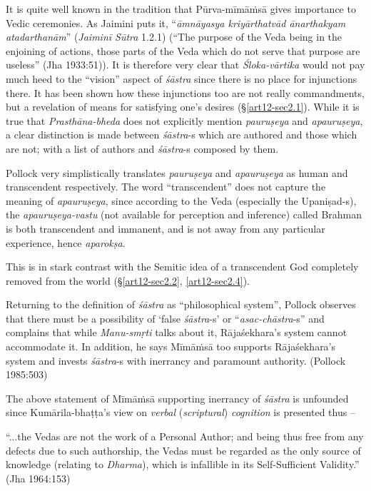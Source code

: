 It is quite well known in the tradition that Pūrva-mīmāṁsā gives importance to Vedic ceremonies. As Jaimini puts it, ``{\sl āmnāyasya kriyārthatvād ānarthakyam atadarthanām}'' ({\sl Jaiminī Sūtra} 1.2.1) (``The purpose of the Veda being in the enjoining of actions, those parts of the Veda which do not serve that purpose are useless'' (Jha 1933:51)). It is therefore very clear that {\sl Śloka-vārtika} would not pay much heed to the ``vision'' aspect of {\sl śāstra} since there is no place for injunctions there. It has been shown how these injunctions too are not really commandments, but a revelation of means for satisfying one's desires (\S\ref{art12-sec2.1}). While it is true that {\sl Prasthāna-bheda} does not explicitly mention {\sl pauruṣeya} and {\sl apauruṣeya}, a clear distinction is made between {\sl śāstra}-s which are authored and those which are not; with a list of authors and {\sl śāstra}-s composed by them. 

Pollock very simplistically translates {\sl pauruṣeya} and {\sl apauruṣeya}  as human and transcendent respectively. The word ``transcendent'' does not capture the meaning of {\sl apauruṣeya}, since according to the Veda (especially the Upaniṣad-s), the {\sl apauruṣeya-vastu} (not available for perception and inference) called Brahman is both transcendent and immanent, and is not away from any particular experience, hence {\sl aparokṣa}.

This is in stark contrast with the Semitic idea of a transcendent God completely removed from the world (\S\ref{art12-sec2.2}, \ref{art12-sec2.4}). 

Returning to the deﬁnition of {\sl śāstra} as ``philosophical system'', Pollock observes that there must be a possibility of `false {\sl śāstra}-s' or ``{\sl asac-chāstra}-s'' and complains that while {\sl Manu-smṛti} talks about it, Rājaśekhara's system cannot accommodate it. In addition, he says Mīmāṁsā too supports Rājaśekhara's system and invests {\sl śāstra}-s with inerrancy and paramount authority. (Pollock 1985:503)

The above statement of Mīmāṁsā supporting inerrancy of {\sl śāstra} is unfounded since Kumārila-bhaṭṭa's view on {\sl verbal} ({\sl scriptural}) {\sl cognition} is presented thus --
\begin{myquote}
“...the Vedas are not the work of a Personal Author; and being thus free from any defects due to such authorship, the Vedas must be regarded as the only source of knowledge (relating to {\sl Dharma}), which is infallible in its Self-Sufficient Validity.'' (Jha 1964:153)
\end{myquote}

